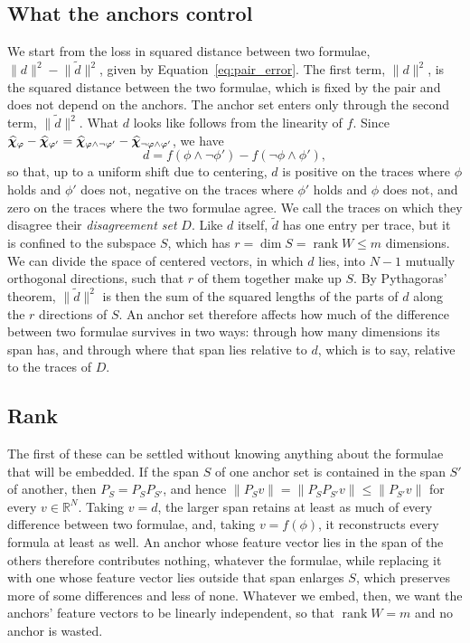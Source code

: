 \documentclass[titlepage,a4paper,11pt]{report}
\begin{document}
    \subsection{What the anchors control}\label{sec:what_anchors_control}
    We start from the loss in squared distance between two formulae, $\lVert d\rVert^2-\lVert\tilde d\rVert^2$, given by Equation~\eqref{eq:pair_error}. The first term, $\lVert d\rVert^2$, is the squared distance between the two formulae, which is fixed by the pair and does not depend on the anchors. The anchor set enters only through the second term, $\lVert \tilde d\rVert^2$. What $d$ looks like follows from the linearity of $f$. Since $\bm{\widehat\chi}_\varphi-\bm{\widehat\chi}_{\varphi'}=\bm{\widehat\chi}_{\varphi\land\neg\varphi'}-\bm{\widehat\chi}_{\neg\varphi\land\varphi'}$, we have
    \begin{equation}\label{eq:difference_vector}
        d=f(\phi\land\neg\phi')-f(\neg\phi\land\phi'),
    \end{equation}
    so that, up to a uniform shift due to centering, $d$ is positive on the traces where $\phi$ holds and $\phi'$ does not, negative on the traces where $\phi'$ holds and $\phi$ does not, and zero on the traces where the two formulae agree. We call the traces on which they disagree their \emph{disagreement set} $D$. Like $d$ itself, $\tilde d$ has one entry per trace, but it is confined to the subspace $S$, which has $r=\dim S=\operatorname{rank}W\le m$ dimensions. We can divide the space of centered vectors, in which $d$ lies, into $N-1$ mutually orthogonal directions, such that $r$ of them together make up $S$. By Pythagoras' theorem, $\lVert \tilde d\rVert^2$ is then the sum of the squared lengths of the parts of $d$ along the $r$ directions of $S$. An anchor set therefore affects how much of the difference between two formulae survives in two ways: through how many dimensions its span has, and through where that span lies relative to $d$, which is to say, relative to the traces of $D$.
 
    \subsection{Rank}\label{sec:rank}
    The first of these can be settled without knowing anything about the formulae that will be embedded. If the span $S$ of one anchor set is contained in the span $S'$ of another, then $P_S = P_S P_{S'}$, and hence $\lVert P_S v\rVert = \lVert P_S P_{S'} v\rVert \le \lVert P_{S'} v\rVert$ for every $v\in\mathbb R^N$. Taking $v=d$, the larger span retains at least as much of every difference between two formulae, and, taking $v=f(\phi)$, it reconstructs every formula at least as well. An anchor whose feature vector lies in the span of the others therefore contributes nothing, whatever the formulae, while replacing it with one whose feature vector lies outside that span enlarges $S$, which preserves more of some differences and less of none. Whatever we embed, then, we want the anchors' feature vectors to be linearly independent, so that $\operatorname{rank}W = m$ and no anchor is wasted.
 
\end{document}
